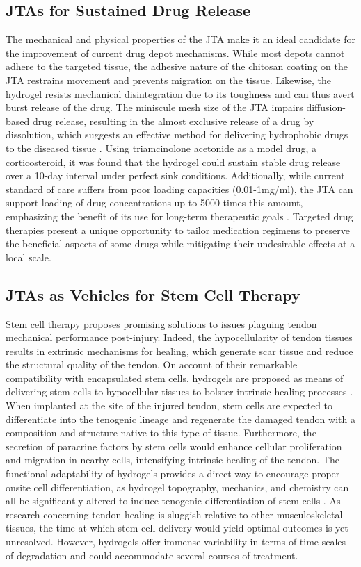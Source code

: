 \subsection{JTAs for Sustained Drug Release}
The mechanical and physical properties of the JTA make it an ideal candidate for the improvement of current drug depot mechanisms. While most depots cannot adhere to the targeted tissue, the adhesive nature of the chitosan coating on the JTA restrains movement and prevents migration on the tissue. Likewise, the hydrogel resists mechanical disintegration due to its toughness and can thus avert burst release of the drug. The miniscule mesh size of the JTA impairs diffusion-based drug release, resulting in the almost exclusive release of a drug by dissolution, which suggests an effective method for delivering hydrophobic drugs to the diseased tissue \autocite{jta_poc}. Using triamcinolone acetonide as a model drug, a corticosteroid, it was found that the hydrogel could sustain stable drug release over a 10-day interval under perfect sink conditions. Additionally, while current standard of care suffers from poor loading capacities (0.01-1mg/ml), the JTA can support loading of drug concentrations up to 5000 times this amount, emphasizing the benefit of its use for long-term therapeutic goals \autocite{jta_poc}. Targeted drug therapies present a unique opportunity to tailor medication regimens to preserve the beneficial aspects of some drugs while mitigating their undesirable effects at a local scale.

\subsection{JTAs as Vehicles for Stem Cell Therapy}
Stem cell therapy proposes promising solutions to issues plaguing tendon mechanical performance post-injury. Indeed, the hypocellularity of tendon tissues results in extrinsic mechanisms for healing, which generate scar tissue and reduce the structural quality of the tendon. On account of their remarkable compatibility with encapsulated stem cells, hydrogels are proposed as means of delivering stem cells to hypocellular tissues to bolster intrinsic healing processes \autocite{intro}. When implanted at the site of the injured tendon, stem cells are expected to differentiate into the tenogenic lineage and regenerate the damaged tendon with a composition and structure native to this type of tissue. Furthermore, the secretion of paracrine factors by stem cells would enhance cellular proliferation and migration in nearby cells, intensifying intrinsic healing of the tendon. The functional adaptability of hydrogels provides a direct way to encourage proper onsite cell differentiation, as hydrogel topography, mechanics, and chemistry can all be significantly altered to induce tenogenic differentiation of stem cells \autocite{intro}. As research concerning tendon healing is sluggish relative to other musculoskeletal tissues, the time at which stem cell delivery would yield optimal outcomes is yet unresolved. However, hydrogels offer immense variability in terms of time scales of degradation and could accommodate several courses of treatment. 